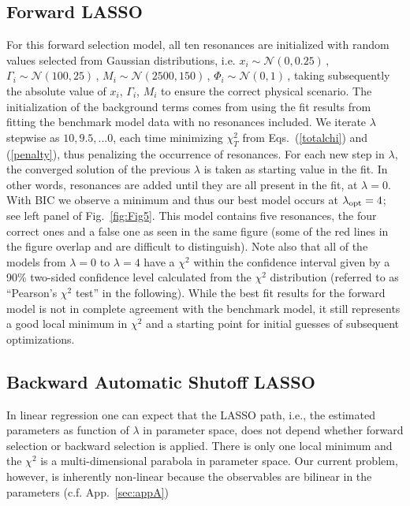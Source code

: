 \documentclass[10pt,aps,prc,superscriptaddress,twoside,twocolumn,nofootinbib,showpacs,preprintnumbers]{revtex4-1}
\begin{document}
\subsection{Forward LASSO}
\label{sec:fwd}

 For this forward selection model, all ten resonances are initialized with random values selected from Gaussian distributions, i.e. $x_i \sim \mathcal{N}(0,0.25)\,$, $\Gamma_i\sim\mathcal{N}(100,25)\,$, $M_i\sim \mathcal{N}(2500,150)\,$, $\Phi_i\sim\mathcal{N}(0,1)\,$, taking subsequently the absolute value of $x_i$, $\Gamma_i$, $M_i$ to ensure the correct physical scenario. The initialization of the background terms comes from using the fit results from fitting the benchmark model data with no resonances included. We iterate  $\lambda$ stepwise as $10,9.5,...0$, each time minimizing $\chi^2_T$ from Eqs.~(\ref{totalchi}) and (\ref{penalty}), thus penalizing the occurrence of resonances. For each new step in $\lambda$, the converged solution of the previous $\lambda$ is taken as starting value in the fit. In other words, resonances are added until they are all present in the fit, at $\lambda=0$. With BIC we observe a minimum and thus our best model occurs at $\lambda_{\rm opt}=4$; see left panel of Fig.~\ref{fig:Fig5}. This model contains five resonances, the four correct ones and a false one as seen in the same figure (some of the red lines in the figure overlap and are difficult to distinguish). Note also that all of the models from $\lambda=0$ to $\lambda=4$ have a $\chi^2$ within the confidence interval given by a  90\% two-sided confidence level calculated from the $\chi^2$ distribution (referred to as ``Pearson's $\chi^2$ test'' in the following). While the best fit results for the forward model is not in complete agreement with the benchmark model, it still represents a good local minimum in $\chi^2$ and a starting point for initial guesses of subsequent optimizations.


\subsection{Backward Automatic Shutoff LASSO }

In linear regression one can expect that the LASSO path, i.e., the estimated parameters as function of $\lambda$ in parameter space, does not depend whether forward selection or backward selection is applied. There is only one local minimum and the $\chi^2$ is a multi-dimensional parabola in parameter space. Our current problem, however, is inherently non-linear because the observables are bilinear in the parameters (c.f. App.~\ref{sec:appA})
\end{document}
